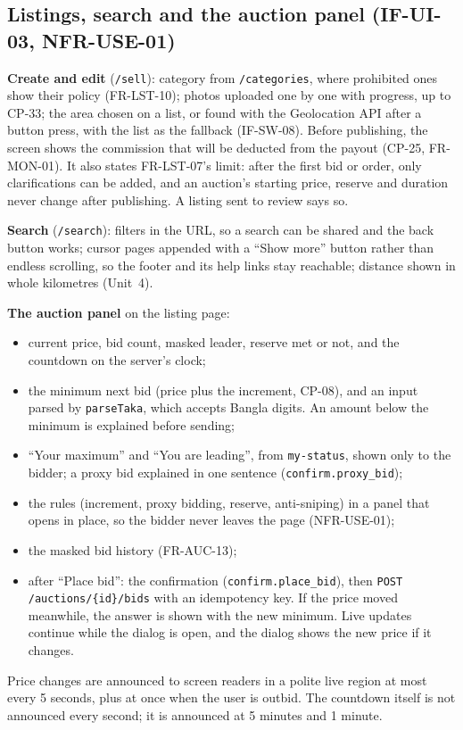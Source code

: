 \documentclass[11pt,a4paper]{article}
\begin{document}
\subsection{Listings, search and the auction panel (IF-UI-03, NFR-USE-01)}
\textbf{Create and edit} (\texttt{/sell}): category from \texttt{/categories}, where prohibited ones show their policy (FR-LST-10); photos uploaded one by one with progress, up to CP-33; the area chosen on a list, or found with the Geolocation API after a button press, with the list as the fallback (IF-SW-08). Before publishing, the screen shows the commission that will be deducted from the payout (CP-25, FR-MON-01). It also states FR-LST-07's limit: after the first bid or order, only clarifications can be added, and an auction's starting price, reserve and duration never change after publishing. A listing sent to review says so.

\textbf{Search} (\texttt{/search}): filters in the URL, so a search can be shared and the back button works; cursor pages appended with a ``Show more'' button rather than endless scrolling, so the footer and its help links stay reachable; distance shown in whole kilometres (Unit~4).

\textbf{The auction panel} on the listing page:
\begin{itemize}[nosep]
  \item current price, bid count, masked leader, reserve met or not, and the countdown on the server's clock;
  \item the minimum next bid (price plus the increment, CP-08), and an input parsed by \texttt{parseTaka}, which accepts Bangla digits. An amount below the minimum is explained before sending;
  \item ``Your maximum'' and ``You are leading'', from \texttt{my-status}, shown only to the bidder; a proxy bid explained in one sentence (\texttt{confirm.proxy\_bid});
  \item the rules (increment, proxy bidding, reserve, anti-sniping) in a panel that opens in place, so the bidder never leaves the page (NFR-USE-01);
  \item the masked bid history (FR-AUC-13);
  \item after ``Place bid'': the confirmation (\texttt{confirm.place\_bid}), then \texttt{POST /auctions/\{id\}/bids} with an idempotency key. If the price moved meanwhile, the answer is shown with the new minimum. Live updates continue while the dialog is open, and the dialog shows the new price if it changes.
\end{itemize}
Price changes are announced to screen readers in a polite live region at most every 5 seconds, plus at once when the user is outbid. The countdown itself is not announced every second; it is announced at 5 minutes and 1 minute.
\end{document}
